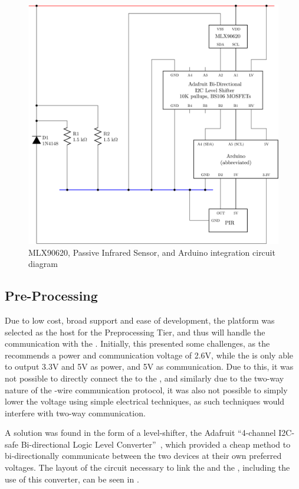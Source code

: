 \documentclass[../thesis/thesis.tex]{subfiles}
\begin{document}
\begin{figure}
\centering
\includegraphics[width=\textwidth]{../diagrams/mlx-arduino2.pdf}
\caption{MLX90620, Passive Infrared Sensor, and Arduino integration circuit diagram}
\label{fig:circuits:node}
\end{figure}

\subsection{Pre-Processing}

Due to low cost, broad support and ease of development, the \ard platform was selected as the host for the Preprocessing Tier, and thus will handle the \iic communication with the \mlx. Initially, this presented some challenges, as the \mlx recommends a power and communication voltage of 2.6V, while the \ard is only able to output 3.3V and 5V as power, and 5V as communication. Due to this, it was not possible to directly connect the \ard to the \mlx, and similarly due to the two-way nature of the -wire communication protocol, it was also not possible to simply lower the \ard voltage using simple electrical techniques, as such techniques would interfere with two-way communication.

A solution was found in the form of a \iic level-shifter, the Adafruit ``4-channel I2C-safe Bi-directional Logic Level Converter''~\cite{AdafruitI2C}, which provided a cheap method to bi-directionally communicate between the two devices at their own preferred voltages. The layout of the circuit necessary to link the \ard and the \mlx, including the use of this converter, can be seen in .
\end{document}

